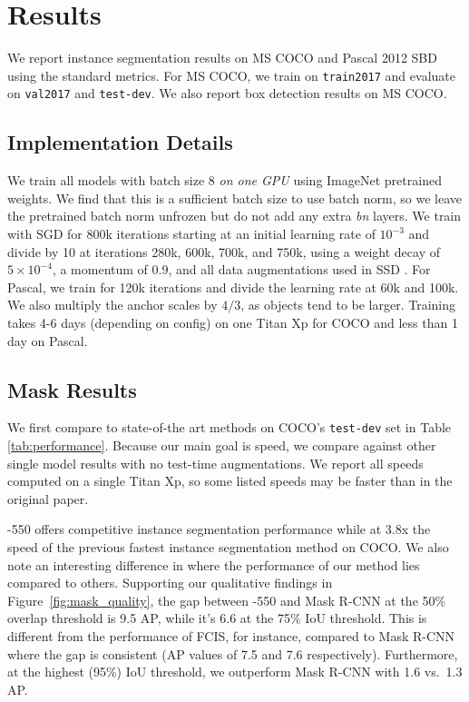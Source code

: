 \documentclass[10pt,journal,compsoc]{IEEEtran}
\begin{document}
\section{Results} \label{sec:results}


We report instance segmentation results on MS COCO \cite{coco} and Pascal 2012 SBD~\cite{sbd} using the standard metrics. For MS COCO, we train on {\tt train2017} and evaluate on {\tt val2017} and {\tt test-dev}.  We also report box detection results on MS COCO.

\subsection{Implementation Details}
We train all models with batch size 8 \textit{on one GPU} using ImageNet \cite{imagenet} pretrained weights. We find that this is a sufficient batch size to use batch norm, so we leave the pretrained batch norm unfrozen but do not add any extra \textit{bn} layers. We train with SGD for 800k iterations starting at an initial learning rate of $10^{-3}$ and divide by 10 at iterations 280k, 600k, 700k, and 750k, using a weight decay of $5{\times}10^{-4}$, a momentum of 0.9, and all data augmentations used in SSD \cite{ssd}. For Pascal, we train for 120k iterations and divide the learning rate at 60k and 100k. We also multiply the anchor scales by $4/3$, as objects tend to be larger. Training takes 4-6 days (depending on config) on one Titan Xp for COCO and less than 1 day on Pascal.

\subsection{Mask Results}
We first compare \methodname{} to state-of-the art methods on COCO's {\tt test-dev} set in Table \ref{tab:performance}. Because our main goal is speed, we compare against other single model results with no test-time augmentations. We report all speeds computed on a single Titan Xp, so some listed speeds may be faster than in the original paper.
    
\methodname{}-550 offers competitive instance segmentation performance while at 3.8x the speed of the previous fastest instance segmentation method on COCO. We also note an interesting difference in where the performance of our method lies compared to others. Supporting our qualitative findings in Figure~\ref{fig:mask_quality}, the gap between \methodname{}-550 and Mask R-CNN at the 50\% overlap threshold is 9.5 AP, while it's 6.6 at the 75\% IoU threshold. This is different from the performance of FCIS, for instance, compared to Mask R-CNN where the gap is consistent (AP values of 7.5 and 7.6 respectively). Furthermore, at the highest (95\%) IoU threshold, we outperform Mask R-CNN with 1.6 vs.~1.3 AP.
\end{document}
